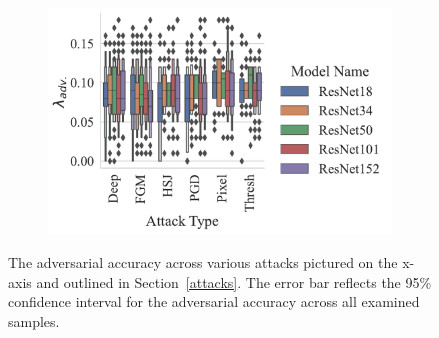 \begin{figure}
\begin{subfigure}[]{0.27\textwidth}
\end{subfigure}
\begin{subfigure}[]{0.36\textwidth}
    \centering
    \includegraphics[width=\textwidth]{mnist/adv_accuracy_vs_attack_type.pdf}
\end{subfigure}
\caption{The adversarial accuracy across various attacks pictured on the x-axis and outlined in Section~\ref{attacks}. The error bar reflects the 95\% confidence interval for the adversarial accuracy across all examined samples.}
\label{fig:mnist_accuracies}
\end{figure}

